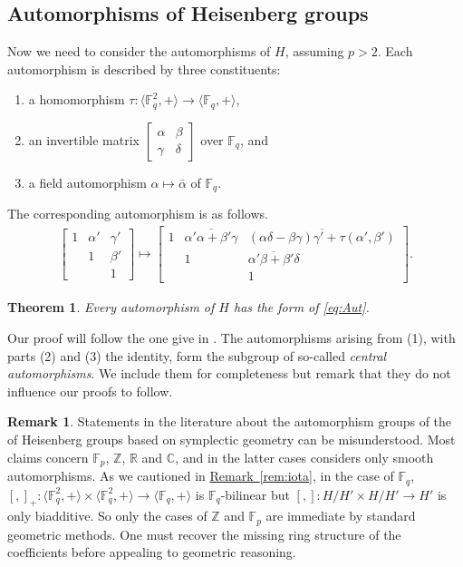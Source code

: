 \documentclass[11pt]{article}
\numberwithin{equation}{section}
\theoremstyle{definition}
\newtheorem{remark}[theorem]{Remark}
\theoremstyle{plain}
\newcommand{\expref}[2]{\hyperref[#2]{#1~\ref{#2}}}
\numberwithin{equation}{section}
\theoremstyle{plain}       %
\newtheorem{thm}[equation]{Theorem}
\theoremstyle{remark}
\theoremstyle{definition}
\numberwithin{figure}{section}
\numberwithin{table}{section}
\newcommand{\bbF}{\mathbb{F}}  %
\begin{document}
\subsection{Automorphisms of Heisenberg groups}
Now we need to consider the automorphisms of $H$, assuming $p>2$.
Each automorphism is described by three constituents:
\begin{enumerate}
\item a homomorphism $\tau:\langle \bbF_q^2,+\rangle 
\to \langle \bbF_q,+\rangle$,
\item an invertible matrix $\begin{bmatrix}\alpha & \beta\\ \gamma & \delta
\end{bmatrix}$ over $\bbF_q$, and
\item a field automorphism $\alpha\mapsto \bar{\alpha}$ of $\bbF_q$.
\end{enumerate}
The corresponding automorphism is as follows.
\begin{align}\label{eq:Aut}
	\begin{bmatrix}
		1 & \alpha' & \gamma'\\ & 1 & \beta' \\ & & 1 
	\end{bmatrix}
	\mapsto
	\begin{bmatrix}
		1 & \overline{\alpha'\alpha+\beta'\gamma} & 
		\overline{(\alpha\delta-\beta\gamma)\gamma'+\tau(\alpha',\beta')}\\ 
		& 1 & \overline{\alpha'\beta+\beta'\delta} \\ 
		& & 1 
	\end{bmatrix}.	
\end{align}
\begin{thm}\label{thm:Aut-Hei}
Every automorphism of $H$ has the form of \eqref{eq:Aut}.
\end{thm}

Our proof will follow the one give in \cite[Proposition~2.9 \& Theorem~4.1]{LW}.
The automorphisms arising from (1), with parts (2) and (3) the identity, form
the subgroup of so-called \emph{central automorphisms}.  We include them for
completeness but remark that they do not influence our proofs to follow.

\begin{remark}
Statements in the literature about the automorphism groups of the of Heisenberg
groups based on symplectic geometry can be misunderstood.  Most claims concern
$\bbF_p$, $\mathbb{Z}$, $\mathbb{R}$ and $\mathbb{C}$, and in the latter cases
considers only smooth automorphisms. As we cautioned in \expref{Remark}{rem:iota},
in the case of $\bbF_q$, $[,]_+:\langle \bbF_q^2,+\rangle\times \langle
\bbF_q^2,+\rangle \to \langle \bbF_q,+\rangle$  is $\bbF_q$-bilinear but
$[,]:H/H'\times H/H'\to H'$ is only biadditive.  So only the cases of
$\mathbb{Z}$ and $\bbF_p$ are immediate by standard geometric methods.  One must
recover the missing ring structure of the coefficients before appealing to
geometric reasoning.
\end{remark}
\end{document}
